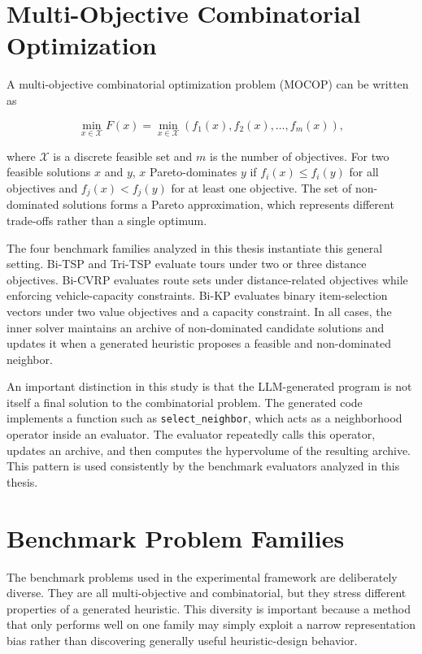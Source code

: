 \documentclass[../main.tex]{subfiles}
\begin{document}
\section{Multi-Objective Combinatorial Optimization}

A multi-objective combinatorial optimization problem (MOCOP) can be written as

\begin{equation}
  \min_{x \in \mathcal{X}} F(x)
  =
  \min_{x \in \mathcal{X}} \left(f_1(x), f_2(x), \ldots, f_m(x)\right),
\end{equation}

where $\mathcal{X}$ is a discrete feasible set and $m$ is the number of objectives. For two feasible solutions $x$ and $y$, $x$ Pareto-dominates $y$ if $f_i(x) \le f_i(y)$ for all objectives and $f_j(x) < f_j(y)$ for at least one objective. The set of non-dominated solutions forms a Pareto approximation, which represents different trade-offs rather than a single optimum.

The four benchmark families analyzed in this thesis instantiate this general setting. Bi-TSP and Tri-TSP evaluate tours under two or three distance objectives. Bi-CVRP evaluates route sets under distance-related objectives while enforcing vehicle-capacity constraints. Bi-KP evaluates binary item-selection vectors under two value objectives and a capacity constraint. In all cases, the inner solver maintains an archive of non-dominated candidate solutions and updates it when a generated heuristic proposes a feasible and non-dominated neighbor.

An important distinction in this study is that the LLM-generated program is not itself a final solution to the combinatorial problem. The generated code implements a function such as \texttt{select\_neighbor}, which acts as a neighborhood operator inside an evaluator. The evaluator repeatedly calls this operator, updates an archive, and then computes the hypervolume of the resulting archive. This pattern is used consistently by the benchmark evaluators analyzed in this thesis.

\section{Benchmark Problem Families}

The benchmark problems used in the experimental framework are deliberately diverse. They are all multi-objective and combinatorial, but they stress different properties of a generated heuristic. This diversity is important because a method that only performs well on one family may simply exploit a narrow representation bias rather than discovering generally useful heuristic-design behavior.
\end{document}
